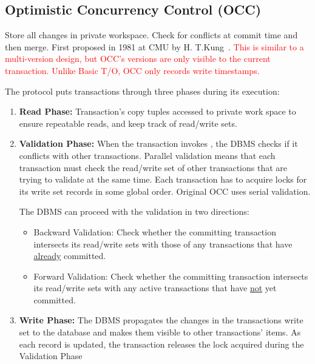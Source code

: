 \documentclass[11pt]{article}
\newcommand{\rr}[1]{\textcolor{red}{#1}}
\begin{document}
\subsection*{Optimistic Concurrency Control (OCC)}
Store all changes in private workspace.
Check for conflicts at commit time and then merge.
First proposed in 1981 at CMU by H. T.Kung~\cite{p213-kung}. \rr{This is similar to a multi-version design, but OCC's versions are only visible to the current transaction. Unlike Basic T/O, OCC only records write timestamps.}

The protocol puts transactions through three phases during its execution:
\begin{enumerate}
    \item \textbf{Read Phase:}
    Transaction's copy tuples accessed to private work space to ensure repeatable reads, and keep 
    track of read/write sets.
    
    \item \textbf{Validation Phase:}
    When the transaction invokes , the DBMS checks if it conflicts with other 
    transactions. Parallel validation means that each transaction must check the read/write set of 
    other transactions that are trying to validate at the same time. Each transaction has to acquire 
    locks for its write set records in some global order. Original OCC uses serial validation.
    
    The DBMS can proceed with the validation in two directions:
    \begin{itemize}
        \item Backward Validation:
        Check whether the committing transaction intersects its read/write sets with those of any 
        transactions that have \underline{already} committed.
        
        \item Forward Validation:
        Check whether the committing transaction intersects its read/write sets with any active 
        transactions that have \underline{not} yet committed.
    \end{itemize}
    
    \item \textbf{Write Phase:}
    The DBMS propagates the changes in the transactions write set to the database and makes them 
    visible to other transactions' items. As each record is updated, the transaction releases the 
    lock acquired during the Validation Phase
\end{enumerate}
\end{document}
